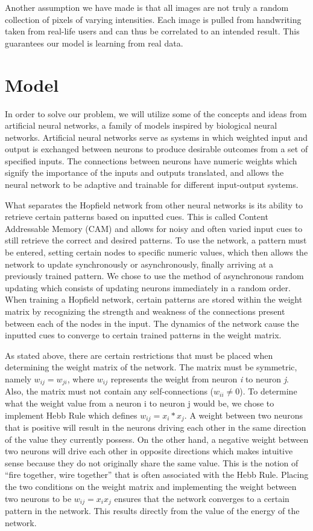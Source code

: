 \documentclass[]{article}
\theoremstyle{plain}
\theoremstyle{definition}
\begin{document}
Another assumption we have made is that all images are not truly a random collection of pixels of varying intensities.  Each image is pulled from handwriting taken from real-life users and can thus be correlated to an intended result.  This guarantees our model is learning from real data.


\section{Model}
In order to solve our problem, we will utilize some of the concepts and ideas from artificial neural networks, a family of models inspired by biological neural networks. Artificial neural networks serve as systems in which weighted input and output is exchanged between neurons to produce desirable outcomes from a set of specified inputs. The connections between neurons have numeric weights which signify the importance of the inputs and outputs translated, and allows the neural network to be adaptive and trainable for different input-output systems.


What separates the Hopfield network from other neural networks is its ability to retrieve certain patterns based on inputted cues. This is called Content Addressable Memory (CAM) and allows for noisy and often varied input cues to still retrieve the correct and desired patterns. To use the network, a pattern must be entered, setting certain nodes to specific numeric values, which then allows the network to update synchronously or asynchronously, finally arriving at a previously trained pattern. We chose to use the method of asynchronous random updating which consists of updating neurons immediately in a random order. When training a Hopfield network, certain patterns are stored within the weight matrix by recognizing the strength and weakness of the connections present between each of the nodes in the input. The dynamics of the network cause the inputted cues to converge to certain trained patterns in the weight matrix.  


As stated above, there are certain restrictions that must be placed when determining the weight matrix of the network. The matrix must be symmetric, namely $ w_{ij} = w_{ji} $, where $w_{ij}$ represents the weight from neuron \textit{i} to neuron \textit{j}. Also, the matrix must not contain any self-connections ($w_{ii} \neq 0$). To determine what the weight value from a neuron i to neuron j would be, we chose to implement Hebb Rule which defines $w_{ij} = x_{i} * x_{j}$. A weight between two neurons that is positive will result in the neurons driving each other in the same direction of the value they currently possess. On the other hand, a negative weight between two neurons will drive each other in opposite directions which makes intuitive sense because they do not originally share the same value. This is the notion of ``fire together, wire together'' that is often associated with the Hebb Rule. Placing the two conditions on the weight matrix and implementing the weight between two neurons to be $w_{ij} = x_{i}x_{j}$ ensures that the network converges to a certain pattern in the network. This results directly from the value of the energy of the network.
\end{document}
